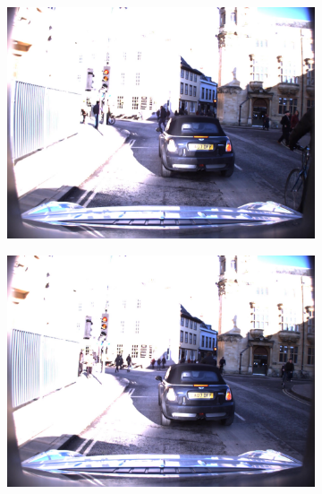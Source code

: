 \documentclass[10pt, aspectratio=169]{beamer}
\begin{document}
\iffalse
\begin{frame}{}
       \begin{figure}
        \centering
        \begin{subfigure}{0.46\textwidth}
            \includegraphics[width=\textwidth]{contents/images/ex3/02744.jpg}
        \end{subfigure}
        \hfill
        \hfill
        \begin{subfigure}{0.46\textwidth}
            \includegraphics[width=\textwidth]{contents/images/ex3/02784.jpg}
        \end{subfigure}
    \end{figure}
\end{frame}
\end{document}
